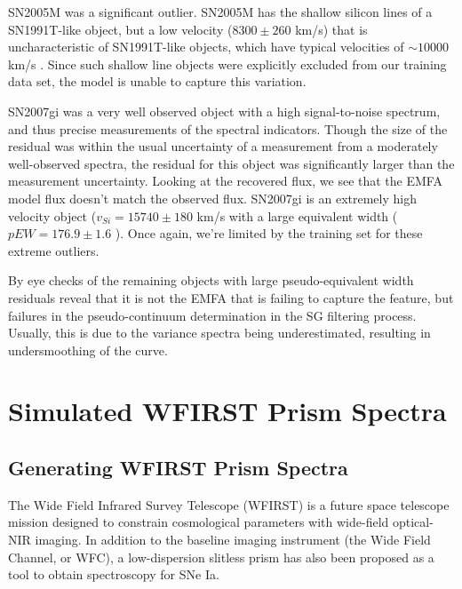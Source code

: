 SN2005M was a significant outlier. SN2005M has the shallow silicon lines of a SN1991T-like object, but a low velocity ($8300\pm 260$ km/s) that is uncharacteristic of SN1991T-like objects, which have typical velocities of $\sim 10000$ km/s \citep{blondin_sn2005m_2012}. Since such shallow line objects were explicitly excluded from our training data set, the model is unable to capture this variation.

SN2007gi was a very well observed object with a high signal-to-noise spectrum, and thus precise measurements of the spectral indicators. Though the size of the residual was within the usual uncertainty of a measurement from a moderately well-observed spectra, the residual for this object was significantly larger than the measurement uncertainty. Looking at the recovered flux, we see that the EMFA model flux doesn't match the observed flux. SN2007gi is an extremely high velocity object ($v_{Si}=15740\pm180$ km/s with a large equivalent width ($pEW=176.9\pm1.6$ \angstrom). Once again, we're limited by the training set for these extreme outliers.

By eye checks of the remaining objects with large pseudo-equivalent width residuals reveal that it is not the EMFA that is failing to capture the feature, but failures in the pseudo-continuum determination in the SG filtering process. Usually, this is due to the variance spectra being underestimated, resulting in undersmoothing of the curve.

\section{Simulated WFIRST Prism Spectra}
\label{wfirst}
\subsection{Generating WFIRST Prism Spectra}
The Wide Field Infrared Survey Telescope (WFIRST) is a future space telescope mission designed to constrain cosmological parameters with wide-field optical-NIR imaging. In addition to the baseline imaging instrument (the Wide Field Channel, or WFC), a low-dispersion slitless prism has also been proposed as a tool to obtain spectroscopy for SNe Ia.

